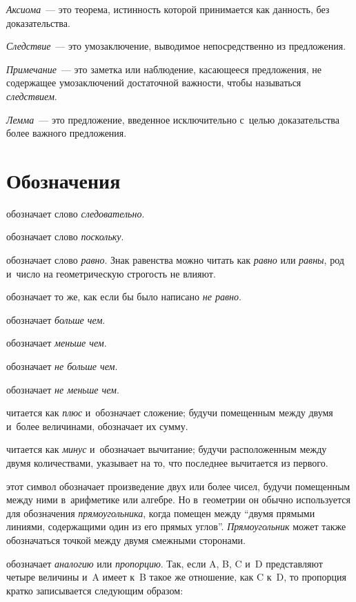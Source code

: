 \documentclass[letters]{byrne-book}
\begin{document}
\emph{Аксиома}~— это теорема, истинность которой принимается как данность, без доказательства.

\emph{Следствие}~— это умозаключение, выводимое непосредственно из предложения.

\emph{Примечание}~— это заметка или наблюдение, касающееся предложения, не содержащее умозаключений достаточной важности, чтобы называться \emph{следствием}.

\emph{Лемма}~— это предложение, введенное исключительно с~целью доказательства более важного предложения.

\vfill\pagebreak

\chapter*{Обозначения}

\symb{$\therefore$}
 обозначает слово \emph{следовательно}.

\symb{$\because$}
 обозначает слово \emph{поскольку}.

\symb{$=$}
 обозначает слово \emph{равно}. Знак равенства можно читать как \emph{равно} или \emph{равны}, род и~число на геометрическую строгость не влияют.

\symb{$\neq$}
 обозначает то же, как если бы было написано \emph{не равно}.

\symb{$>$}
 обозначает \emph{больше чем}.

\symb{$<$}
 обозначает \emph{меньше чем}.

\symb{$\ngtr$}
 обозначает \emph{не больше чем}.

\symb{$\nless$}
 обозначает \emph{не меньше чем}.

\symb{$+$}
 читается как \emph{плюс} и~обозначает сложение; будучи помещенным между двумя и~более величинами, обозначает их сумму.

\symb{$-$}
 читается как \emph{минус} и~обозначает вычитание; будучи расположенным между двумя количествами, указывает на то, что последнее вычитается из первого.

\symb{$\times$}
 этот символ обозначает произведение двух или более чисел, будучи помещенным между ними в~арифметике или алгебре. Но в~геометрии он обычно используется для обозначения \emph{прямоугольника}, когда помещен между \enquote{двумя прямыми линиями, содержащими один из его прямых углов}. \emph{Прямоугольник} может также обозначаться точкой между двумя смежными сторонами.

\symb{$:\ ::\ :$}
 обозначает \emph{аналогию} или \emph{пропорцию}. Так, если A, B, C и~D представляют четыре величины и~A имеет к~B такое же отношение, как C к~D, то пропорция кратко записывается следующим образом:
\end{document}
